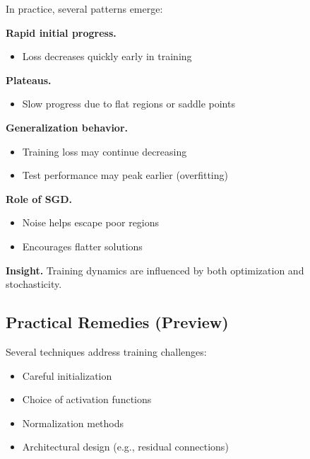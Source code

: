 In practice, several patterns emerge:

\medskip

\noindent
\textbf{Rapid initial progress.}
\begin{itemize}
    \item Loss decreases quickly early in training
\end{itemize}

\medskip

\noindent
\textbf{Plateaus.}
\begin{itemize}
    \item Slow progress due to flat regions or saddle points
\end{itemize}

\medskip

\noindent
\textbf{Generalization behavior.}
\begin{itemize}
    \item Training loss may continue decreasing
    \item Test performance may peak earlier (overfitting)
\end{itemize}

\medskip

\noindent
\textbf{Role of SGD.}
\begin{itemize}
    \item Noise helps escape poor regions
    \item Encourages flatter solutions
\end{itemize}

\medskip

\noindent
\textbf{Insight.}  
Training dynamics are influenced by both optimization and stochasticity.

\subsection{Practical Remedies (Preview)}

Several techniques address training challenges:

\begin{itemize}
    \item Careful initialization
    \item Choice of activation functions
    \item Normalization methods
    \item Architectural design (e.g., residual connections)
\end{itemize}

\medskip

